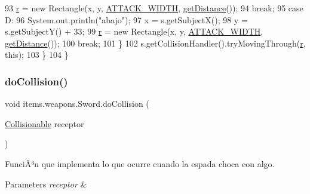 \begin{DoxyCode}
93                     \mbox{\hyperlink{classitems_1_1weapons_1_1_sword_a0e6a4807a1682dc6790d287b01077da9}{r}} = \textcolor{keyword}{new} Rectangle(x, y, \mbox{\hyperlink{classitems_1_1weapons_1_1_sword_a2f54a51059264ae578a63bf4d5a56221}{ATTACK\_WIDTH}}, 
      \mbox{\hyperlink{classitems_1_1weapons_1_1_weapon_a4cc44ba68fb6d469b39ccdbd0fd418b6}{getDistance}}());
94                     \textcolor{keywordflow}{break};
95                 \textcolor{keywordflow}{case} D:
96                     System.out.println(\textcolor{stringliteral}{"abajo"});
97                     x = s.getSubjectX();
98                     y = s.getSubjectY() + 33;
99                     \mbox{\hyperlink{classitems_1_1weapons_1_1_sword_a0e6a4807a1682dc6790d287b01077da9}{r}} = \textcolor{keyword}{new} Rectangle(x, y, \mbox{\hyperlink{classitems_1_1weapons_1_1_sword_a2f54a51059264ae578a63bf4d5a56221}{ATTACK\_WIDTH}}, 
      \mbox{\hyperlink{classitems_1_1weapons_1_1_weapon_a4cc44ba68fb6d469b39ccdbd0fd418b6}{getDistance}}());
100                     \textcolor{keywordflow}{break};
101             \}
102             s.getCollisionHandler().tryMovingThrough(\mbox{\hyperlink{classitems_1_1weapons_1_1_sword_a0e6a4807a1682dc6790d287b01077da9}{r}}, \textcolor{keyword}{this});
103         \}
104     \}
\end{DoxyCode}
\mbox{\label{classitems_1_1weapons_1_1_sword_a3b4292b936e2d5e5aad2b1f0b2c2f935}} 
\subsubsection{\texorpdfstring{do\+Collision()}{doCollision()}}
{\footnotesize\ttfamily void items.\+weapons.\+Sword.\+do\+Collision (\begin{DoxyParamCaption}\item[{\mbox{\hyperlink{interfaceentities_1_1_collisionable}{Collisionable}}}]{receptor }\end{DoxyParamCaption})\hspace{0.3cm}{\ttfamily [inline]}}

FunciÃ³n que implementa lo que ocurre cuando la espada choca con algo.


\begin{DoxyParams}{Parameters}
{\em receptor} & \\
\hline
\end{DoxyParams}


